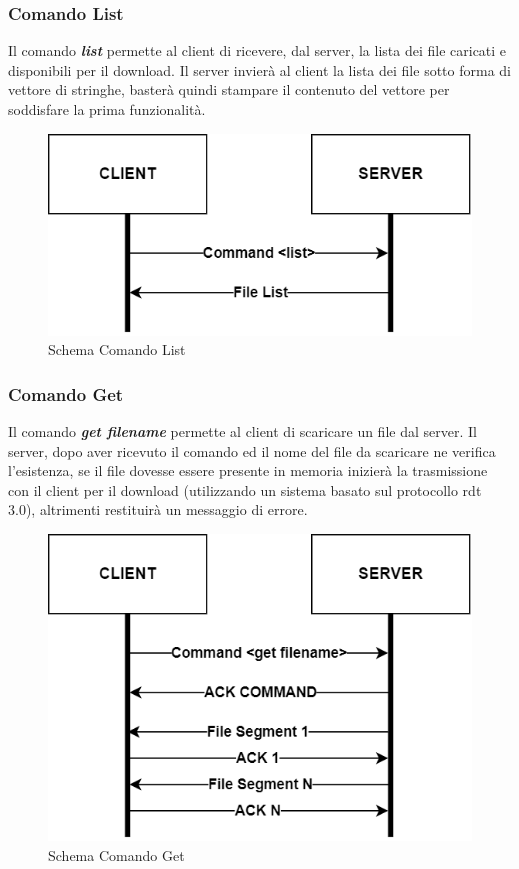\documentclass{article}
\begin{document}
\subsubsection{Comando List}


Il comando \textbf{\emph{list}} permette al client di ricevere, dal server, la lista dei file caricati e disponibili per il download.
Il server invierà al client la lista dei file sotto forma di vettore di stringhe, basterà quindi stampare il contenuto del vettore per soddisfare la prima funzionalità.

\begin{figure}[!htb]
  \includegraphics[width=\linewidth]{commandList.png}
  \caption{Schema Comando List}
\end{figure}

\subsubsection{Comando Get}


Il comando \textbf{\emph{get filename}} permette al client di scaricare un file dal server. Il server, dopo aver ricevuto il comando ed il nome del file da scaricare
ne verifica l'esistenza, se il file dovesse essere presente in memoria inizierà la trasmissione con il client per il download (utilizzando un sistema basato sul protocollo rdt 3.0), altrimenti restituirà un messaggio di errore. 

\begin{figure}[!htb]
  \includegraphics[width=\linewidth]{commandGet.png}
  \caption{Schema Comando Get}
\end{figure}
\end{document}
